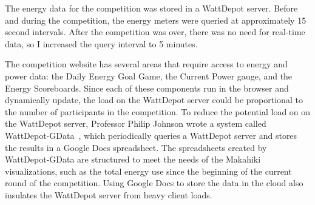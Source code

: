 The energy data for the competition was stored in a WattDepot server. Before and during the competition, the energy meters were queried at approximately 15 second intervals. After the competition was over, there was no need for real-time data, so I increased the query interval to 5 minutes.

The competition website has several areas that require access to energy and power data: the Daily Energy Goal Game, the Current Power gauge, and the Energy Scoreboards. Since each of these components run in the browser and dynamically update, the load on the WattDepot server could be proportional to the number of participants in the competition. To reduce the potential load on on the WattDepot server, Professor Philip Johnson wrote a system called WattDepot-GData~\cite{wattdepot-gdata}, which periodically queries a WattDepot server and stores the results in a Google Docs spreadsheet. The spreadsheets created by WattDepot-GData are structured to meet the needs of the Makahiki visualizations, such as the total energy use since the beginning of the current round of the competition. Using Google Docs to store the data in the cloud also insulates the WattDepot server from heavy client loads.
